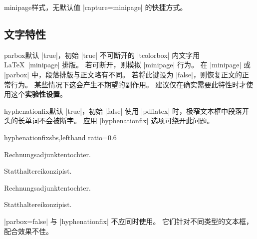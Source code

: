 \begin{docTcbKey}{minipage}{}{样式，无默认值}
  |capture=minipage| 的快捷方式。
\end{docTcbKey}


\clearpage
\subsection{文字特性}
\begin{docTcbKey}[][doc updated=2024-01-10]{parbox}{}{默认 |true|，初始 |true|}
  不可断开的 |tcolorbox| 内文字用 \LaTeX\ |minipage| 排版。
  若可断开，则模拟 |minipage| 行为。
  在 |minipage| 或 |parbox| 中，段落排版与正文略有不同。
  若将此键设为 |false|，则恢复正文的正常行为。
  某些情况下这会产生不期望的副作用。
  建议仅在确实需要此特性时才使用这个\textbf{实验性设置}。
\end{docTcbKey}

\begin{dispListing}

\begin{tcolorbox}[parbox,adjusted title={parbox=true (normal)}]
  \lipsum[1-2]
\end{tcolorbox}\hfill%
\begin{tcolorbox}[parbox=false,adjusted title={parbox=false}]
  \lipsum[1-2]
\end{tcolorbox}%
\end{dispListing}
{\tcbusetemp}


\clearpage
\begin{docTcbKey}{hyphenationfix}{}{默认 |true|，初始 |false|}
  使用 |pdflatex| 时，极窄文本框中段落开头的长单词不会被断字。
  应用 |hyphenationfix| 选项可绕开此问题。

\begin{exdispExample*}{hyphenationfix}{sbs,lefthand ratio=0.6}

\begin{tcolorbox}
Rechnungsadjunktentochter.\par
Statthaltereikonzipist.
\end{tcolorbox}

\begin{tcolorbox}[hyphenationfix]
Rechnungsadjunktentochter.\par
Statthaltereikonzipist.
\end{tcolorbox}
\end{exdispExample*}

\smallskip
\begin{marker}
|parbox=false| 与 |hyphenationfix| 不应同时使用。
它们针对不同类型的文本框，配合效果不佳。
\end{marker}
\end{docTcbKey}


